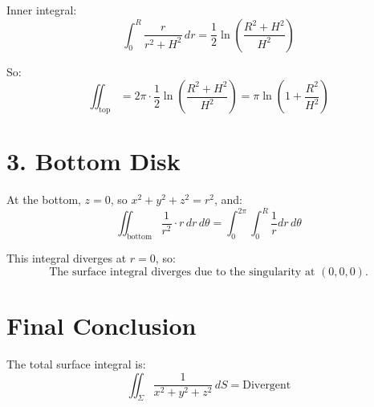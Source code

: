 \documentclass[12pt]{article}
\begin{document}
Inner integral:
\[
\int_0^R \frac{r}{r^2 + H^2}\,dr = \frac{1}{2} \ln\left( \frac{R^2 + H^2}{H^2} \right)
\]

So:
\[
\iint_{\text{top}} = 2\pi \cdot \frac{1}{2} \ln\left( \frac{R^2 + H^2}{H^2} \right)
= \pi \ln\left(1 + \frac{R^2}{H^2} \right)
\]

\section*{3. Bottom Disk}

At the bottom, \( z = 0 \), so \( x^2 + y^2 + z^2 = r^2 \), and:
\[
\iint_{\text{bottom}} \frac{1}{r^2}\cdot r\,dr\,d\theta = \int_0^{2\pi} \int_0^R \frac{1}{r} dr\,d\theta
\]

This integral diverges at \( r = 0 \), so:
\[
\boxed{\text{The surface integral diverges due to the singularity at } (0, 0, 0).}
\]

\section*{Final Conclusion}

The total surface integral is:
\[
\iint_\Sigma \frac{1}{x^2 + y^2 + z^2}\,dS = \boxed{\text{Divergent}}
\]
\end{document}
